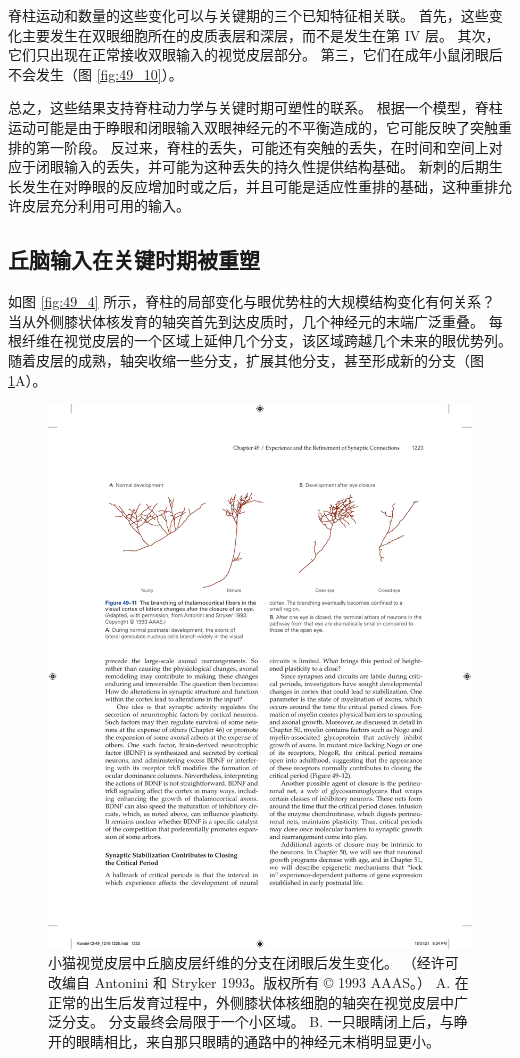 脊柱运动和数量的这些变化可以与关键期的三个已知特征相关联。
首先，这些变化主要发生在双眼细胞所在的皮质表层和深层，而不是发生在第 IV 层。
其次，它们只出现在正常接收双眼输入的视觉皮层部分。
第三，它们在成年小鼠闭眼后不会发生（图 \ref{fig:49_10}）。


总之，这些结果支持脊柱动力学与关键时期可塑性的联系。
根据一个模型，脊柱运动可能是由于睁眼和闭眼输入双眼神经元的不平衡造成的，它可能反映了突触重排的第一阶段。
反过来，脊柱的丢失，可能还有突触的丢失，在时间和空间上对应于闭眼输入的丢失，并可能为这种丢失的持久性提供结构基础。
新刺的后期生长发生在对睁眼的反应增加时或之后，并且可能是适应性重排的基础，这种重排允许皮层充分利用可用的输入。


\subsection{丘脑输入在关键时期被重塑}

如图 \ref{fig:49_4} 所示，脊柱的局部变化与眼优势柱的大规模结构变化有何关系？
当从外侧膝状体核发育的轴突首先到达皮质时，几个神经元的末端广泛重叠。
每根纤维在视觉皮层的一个区域上延伸几个分支，该区域跨越几个未来的眼优势列。
随着皮层的成熟，轴突收缩一些分支，扩展其他分支，甚至形成新的分支（图 \ref{fig:49_11}A）。


\begin{figure}[htbp]
	\centering
	\includegraphics[width=0.95\linewidth]{chap49/fig_49_11}
	\caption{小猫视觉皮层中丘脑皮层纤维的分支在闭眼后发生变化。 （经许可改编自 Antonini 和 Stryker 1993。版权所有 © 1993 AAAS。） A. 在正常的出生后发育过程中，外侧膝状体核细胞的轴突在视觉皮层中广泛分支。 分支最终会局限于一个小区域。 B. 一只眼睛闭上后，与睁开的眼睛相比，来自那只眼睛的通路中的神经元末梢明显更小。}
	\label{fig:49_11}
\end{figure}


